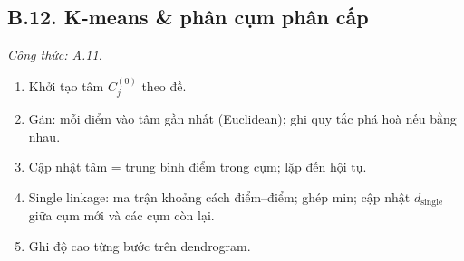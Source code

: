 \subsection*{B.12. K-means \& phân cụm phân cấp}
\textit{Công thức: A.11.}
\begin{enumerate}
  \item Khởi tạo tâm \(C_j^{(0)}\) theo đề.
  \item Gán: mỗi điểm vào tâm gần nhất (Euclidean); ghi quy tắc phá hoà nếu bằng nhau.
  \item Cập nhật tâm = trung bình điểm trong cụm; lặp đến hội tụ.
  \item Single linkage: ma trận khoảng cách điểm--điểm; ghép min; cập nhật \(d_{\mathrm{single}}\) giữa cụm mới và các cụm còn lại.
  \item Ghi độ cao từng bước trên dendrogram.
\end{enumerate}

